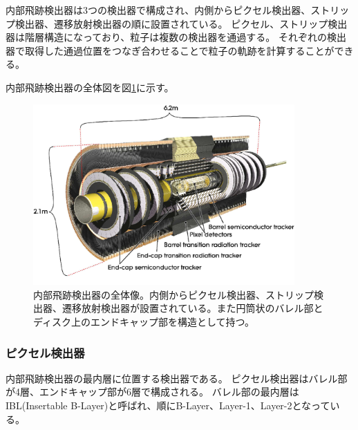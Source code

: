 内部飛跡検出器は3つの検出器で構成され、内側からピクセル検出器、ストリップ検出器、遷移放射検出器の順に設置されている。
ピクセル、ストリップ検出器は階層構造になっており、粒子は複数の検出器を通過する。
それぞれの検出器で取得した通過位置をつなぎ合わせることで粒子の軌跡を計算することができる。

内部飛跡検出器の全体図を図\ref{inner_detector}に示す。

\begin{figure}[bpt]\centering
\includegraphics[width=10cm]{inner_detector}
\caption[内部飛跡検出器の全体像]{内部飛跡検出器の全体像\cite{1-2}。内側からピクセル検出器、ストリップ検出器、遷移放射検出器が設置されている。また円筒状のバレル部とディスク上のエンドキャップ部を構造として持つ。}
\label{inner_detector}
\end{figure}


%

\subsubsection{ピクセル検出器}

内部飛跡検出器の最内層に位置する検出器である。
ピクセル検出器はバレル部が4層、エンドキャップ部が6層で構成される。
バレル部の最内層はIBL(Insertable B-Layer)と呼ばれ、順にB-Layer、Layer-1、Layer-2となっている。

